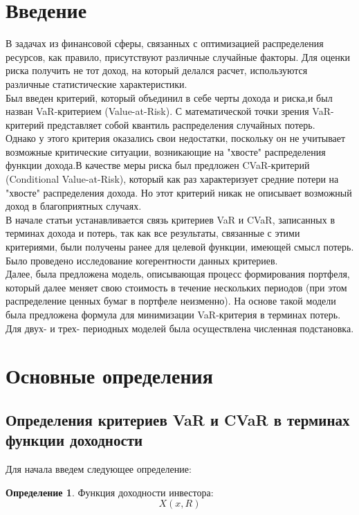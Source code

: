 \documentclass[18pt,a4paper]{article}
\theoremstyle{plain}
\theoremstyle{definition}
\newtheorem{Def}{Определение}[section]
\begin{document}
\centering\section{Введение}
\flushleft
В задачах из финансовой сферы, связанных с оптимизацией распределения ресурсов, как правило, присутствуют различные случайные факторы. Для оценки риска получить не тот доход, на который делался расчет, используются различные статистические характеристики.\\
Был введен критерий, который объединил в себе черты дохода и риска,и был назван VaR-критерием (Value-at-Risk). С математической точки зрения VaR-критерий представляет собой квантиль распределения случайных потерь.\\
Однако у этого критерия оказались свои недостатки, поскольку он не учитывает возможные критические ситуации, возникающие на "хвосте" распределения функции дохода.В качестве меры риска был предложен CVaR-критерий (Conditional Value-at-Risk), который как раз характеризует средние потери на "хвосте" распределения дохода. Но этот критерий никак не описывает возможный доход в благоприятных
случаях.\\
В начале статьи устанавливается связь критериев VaR и CVaR, записанных в терминах дохода и потерь, так как все результаты, связанные с этими критериями,
были получены ранее для целевой функции, имеющей смысл потерь.
Было проведено исследование когерентности данных критериев.\\
Далее, была предложена модель, описывающая процесс формирования портфеля, который далее меняет свою стоимость в течение нескольких периодов (при этом распределение ценных бумаг в портфеле неизменно).
На основе такой модели была предложена формула для минимизации VaR-критерия в терминах потерь.\\
Для двух- и трех- периодных моделей была осуществлена численная подстановка.

\centering\section{Основные определения}
\centering\subsection{Определения критериев VaR и CVaR в терминах функции доходности}
\flushleft\parindent=0.5cm

Для начала введем следующее определение:
\begin{Def} \label{main}
Функция доходности инвестора:
$$
X(x, R)
$$
\end{Def}
\end{document}
